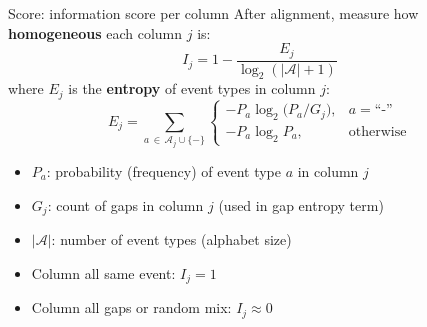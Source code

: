 \documentclass[aspectratio=169,t]{beamer}
\begin{document}
\begin{frame}{Score: information score per column}
  After alignment, measure how \textbf{homogeneous} each column $j$ is:
  \[
    I_j = 1 - \frac{E_j}{\log_2(|\mathcal{A}|+1)}
  \]
  where $E_j$ is the \textbf{entropy} of event types in column $j$:
  \[
    E_j = \sum_{a \,\in\, \mathcal{A}_j \cup \{-\}} \begin{cases}
      -P_a \log_2\!\bigl(P_a / G_j\bigr), & a = \text{``-''} \\[4pt]
      -P_a \log_2 P_a,                     & \text{otherwise}
    \end{cases}
  \]
  \begin{itemize}
    \item $P_a$: probability (frequency) of event type $a$ in column $j$
    \item $G_j$: count of gaps in column $j$ (used in gap entropy term)
    \item $|\mathcal{A}|$: number of event types (alphabet size)
    \item Column all same event: $I_j = 1$
    \item Column all gaps or random mix: $I_j \approx 0$
  \end{itemize}
\end{frame}
\end{document}
